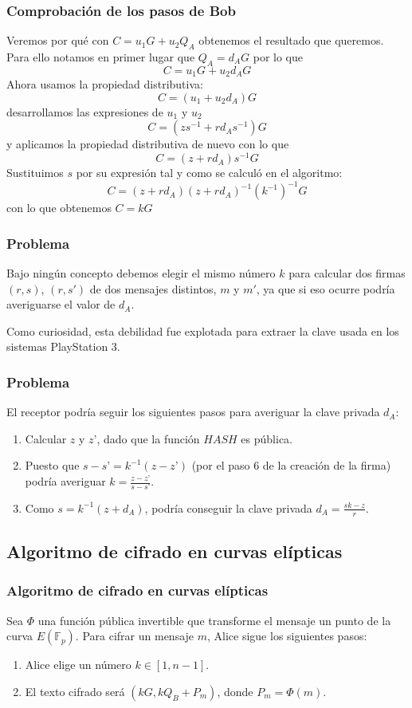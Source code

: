 \documentclass[xcolor=x11names,compress,utf8, 9pt]{beamer}
\begin{document}
\begin{frame}\frametitle{Comprobación de los pasos de Bob}
Veremos por qué con $C=u_1G+u_2Q_A$ obtenemos el resultado que queremos. Para ello notamos en primer lugar que $Q_A=d_AG$ por lo que
$$C=u_1G+u_2d_AG$$
Ahora usamos la propiedad distributiva:
$$C = (u_1+u_2d_A)G$$
desarrollamos las expresiones de $u_1$ y $u_2$
$$C = (zs^{-1}+rd_As^{-1})G$$
y aplicamos la propiedad distributiva de nuevo con lo que
$$C = (z+rd_A)s^{-1}G$$
Sustituimos $s$ por su expresión tal y como se calculó en el
algoritmo:
$$C = (z+rd_A)(z+rd_A)^{-1}(k^{-1})^{-1}G$$
con lo que obtenemos $C = kG$
\end{frame}

\begin{frame}\frametitle{Problema}
  Bajo ningún concepto debemos elegir el mismo número $k$ para
  calcular dos firmas $(r, s)$, $(r, s')$ de dos mensajes distintos,
  $m$ y $m'$, ya que si eso ocurre podría averiguarse el valor de
  $d_A$.

Como curiosidad, esta debilidad fue explotada para extraer la clave
usada en los sistemas PlayStation 3.
\end{frame}

\begin{frame}\frametitle{Problema}
  El receptor podría seguir los siguientes pasos para averiguar la clave privada $d_A$:
  \begin{enumerate}
  \item Calcular $z$ y $z’$, dado que la función $HASH$ es pública.
  \item Puesto que $s-s’ = k^{-1}(z-z’)$ (por el paso 6 de la creación de la firma) podría averiguar $k = \frac{z-z’}{s-s’}$.
  \item Como $s = k^{-1}(z+d_A)$, podría conseguir la clave privada $d_A = \frac{sk-z}{r}$.
 \end{enumerate}
\end{frame}

\subsection{Algoritmo de cifrado en curvas elípticas}

\begin{frame}\frametitle{Algoritmo de cifrado en curvas elípticas}
  Sea $\Phi$ una función pública invertible que transforme el mensaje un
punto de la curva $E(\mathbb{F}_p)$. Para cifrar un mensaje $m$, Alice
sigue los siguientes pasos:

\begin{enumerate}
\item Alice elige un número $k \in [1, n-1]$.
\item El texto cifrado será $(kG, kQ_B+P_m)$, donde $P_m = \Phi(m)$.
\end{enumerate}
\end{frame}
\end{document}
